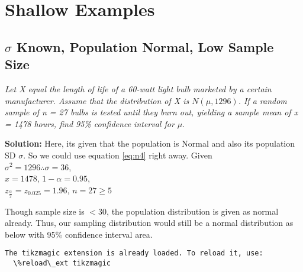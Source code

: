 \documentclass[float=false,crop=false]{standalone}
\begin{document}
    
    
    \maketitle
    
    

    
    \section{Shallow Examples}\label{shallow-examples}

\subsection{\texorpdfstring{\(\sigma\) Known, Population Normal, Low
Sample
Size}{\textbackslash{}sigma Known, Population Normal, Low Sample Size}}\label{sigma-known-population-normal-low-sample-size}

    \emph{Let X equal the length of life of a 60-watt light bulb marketed by
a certain manufacturer. Assume that the distribution of X is
\(N(\mu, 1296)\). If a random sample of n = 27 bulbs is tested until
they burn out, yielding a sample mean of x = 1478 hours, find 95\%
confidence interval for \(\mu\)}.

\textbf{Solution:}
Here, its given that the population is Normal and also its population SD $\sigma$. So we could use equation \ref{eq:n4} right away. 
    Given\\
\(\sigma^2 = 1296 \therefore \sigma = 36\),\\
\(x = 1478\), \(1-\alpha = 0.95\),\\
\(z_{\frac{\alpha}{2}} = z_{0.025} = 1.96\), \(n = 27 \geq 5\)

Though sample size is \(< 30\), the population distribution is given as
normal already. Thus, our sampling distribution would still be a normal
distribution as below with 95\% confidence interval area.
    \begin{Verbatim}[commandchars=\\\{\},fontsize=\footnotesize]
The tikzmagic extension is already loaded. To reload it, use:
  \%reload\_ext tikzmagic

    \end{Verbatim}
    \begin{center}
    \end{center}
    { \hspace*{\fill} \\}
    
\end{document}
